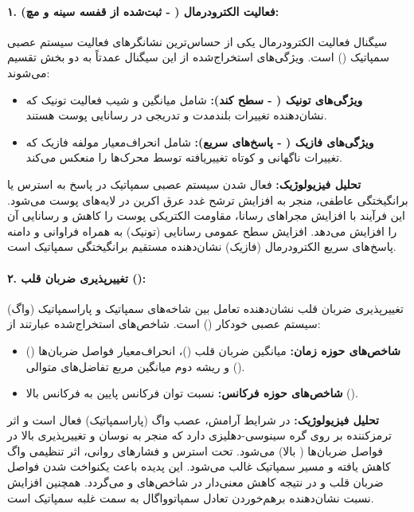 \documentclass[12pt,a4paper]{article}
\begin{document}
\paragraph{۱. فعالیت الکترودرمال ( - ثبت‌شده از قفسه سینه و مچ):}
سیگنال فعالیت الکترودرمال یکی از حساس‌ترین نشانگرهای فعالیت سیستم عصبی سمپاتیک () است. ویژگی‌های استخراج‌شده از این سیگنال عمدتاً به دو بخش تقسیم می‌شوند:
\begin{itemize}
	\item \textbf{ویژگی‌های تونیک ( - سطح کند):} شامل میانگین و شیب فعالیت تونیک که نشان‌دهنده تغییرات بلندمدت و تدریجی در رسانایی پوست هستند.
	\item \textbf{ویژگی‌های فازیک ( - پاسخ‌های سریع):} شامل انحراف‌معیار مولفه فازیک که تغییرات ناگهانی و کوتاه تغییریافته توسط محرک‌ها را منعکس می‌کند.
\end{itemize}
\textbf{تحلیل فیزیولوژیک:} فعال شدن سیستم عصبی سمپاتیک در پاسخ به استرس یا برانگیختگی عاطفی، منجر به افزایش ترشح غدد عرق اکرین در لایه‌های پوست می‌شود. این فرآیند با افزایش مجراهای رسانا، مقاومت الکتریکی پوست را کاهش و رسانایی آن را افزایش می‌دهد. افزایش سطح عمومی رسانایی (تونیک) به همراه فراوانی و دامنه پاسخ‌های سریع الکترودرمال (فازیک) نشان‌دهنده مستقیم برانگیختگی سمپاتیک است.

\paragraph{۲. تغییرپذیری ضربان قلب ():}
تغییرپذیری ضربان قلب نشان‌دهنده تعامل بین شاخه‌های سمپاتیک و پاراسمپاتیک (واگ) سیستم عصبی خودکار () است. شاخص‌های استخراج‌شده عبارتند از:
\begin{itemize}
	\item \textbf{شاخص‌های حوزه زمان:} میانگین ضربان قلب ()، انحراف‌معیار فواصل ضربان‌ها () و ریشه دوم میانگین مربع تفاضل‌های متوالی ().
	\item \textbf{شاخص‌های حوزه فرکانس:} نسبت توان فرکانس پایین به فرکانس بالا ().
\end{itemize}
\textbf{تحلیل فیزیولوژیک:} در شرایط آرامش، عصب واگ (پاراسمپاتیک) فعال است و اثر ترمزکننده بر روی گره سینوسی-دهلیزی دارد که منجر به نوسان و تغییرپذیری بالا در فواصل ضربان‌ها ( بالا) می‌شود. تحت استرس و فشارهای روانی، اثر تنظیمی واگ کاهش یافته و مسیر سمپاتیک غالب می‌شود. این پدیده باعث یکنواخت شدن فواصل ضربان قلب و در نتیجه کاهش معنی‌دار در شاخص‌های  و  می‌گردد. همچنین افزایش نسبت  نشان‌دهنده برهم‌خوردن تعادل سمپاتوواگال به سمت غلبه سمپاتیک است.
\end{document}
